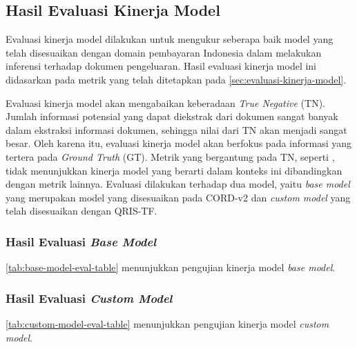 \subsection{Hasil Evaluasi Kinerja Model}
\label{subsec:hasil-evaluasi-kinerja-model}

Evaluasi kinerja model dilakukan untuk mengukur seberapa baik model \donut{} yang telah disesuaikan dengan domain pembayaran Indonesia dalam melakukan inferensi terhadap dokumen pengeluaran. 
Hasil evaluasi kinerja model ini didasarkan pada metrik yang telah ditetapkan pada \autoref{sec:evaluasi-kinerja-model}. 

Evaluasi kinerja model akan mengabaikan keberadaan \emph{True Negative} (TN). Jumlah informasi potensial yang dapat diekstrak dari dokumen sangat banyak dalam ekstraksi informasi dokumen, sehingga nilai dari TN akan menjadi sangat besar. Oleh karena itu, evaluasi kinerja model akan berfokus pada informasi yang tertera pada \emph{Ground Truth} (GT). Metrik yang bergantung pada TN, seperti \accuracy, tidak menunjukkan kinerja model yang berarti dalam konteks ini dibandingkan dengan metrik lainnya. Evaluasi dilakukan terhadap dua model, yaitu \emph{base model} yang merupakan model \donut{} yang disesuaikan pada \dataset{} CORD-v2 dan \emph{custom model} yang telah disesuaikan dengan \dataset{} QRIS-TF.

\subsubsection{Hasil Evaluasi \emph{Base Model}}
\label{subsubsec:hasil-evaluasi-base-model}
\autoref{tab:base-model-eval-table} menunjukkan pengujian kinerja model \emph{base model}. 

\subsubsection{Hasil Evaluasi \emph{Custom Model}}
\label{subsubsec:hasil-evaluasi-custom-model}
\autoref{tab:custom-model-eval-table} menunjukkan pengujian kinerja model \emph{custom model}.
